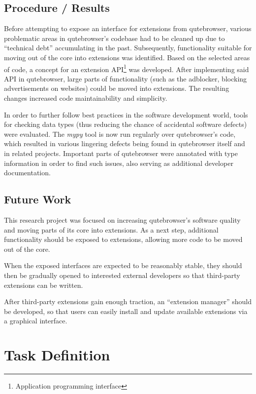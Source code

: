 \documentclass[a4paper,parskip=full,DIV=14,BCOR=15mm]{scrreprt}
\begin{document}
\section*{Procedure / Results}
Before attempting to expose an interface for extensions from qutebrowser,
various problematic areas in qutebrowser's codebase had to be cleaned up due to
``technical debt'' accumulating in the past. Subsequently, functionality
suitable for moving out of the core into extensions was identified. Based on
the selected areas of code, a concept for an extension API\footnote{Application
programming interface} was developed. After implementing said API in
qutebrowser, large parts of functionality (such as the adblocker, blocking
advertisements on websites) could be moved into extensions. The resulting
changes increased code maintainability and simplicity.

In order to further follow best practices in the software development world,
tools for checking data types (thus reducing the chance of accidental software
defects) were evaluated. The \emph{mypy} tool is now run regularly over
qutebrowser's code, which resulted in various lingering defects being found in
qutebrowser itself and in related projects. Important parts of qutebrowser were
annotated with type information in order to find such issues, also serving as
additional developer documentation.

\section*{Future Work}
This research project was focused on increasing qutebrowser's software quality
and moving parts of its core into extensions. As a next step, additional
functionality should be exposed to extensions, allowing more code to be moved
out of the core.

When the exposed interfaces are expected to be reasonably stable,
they should then be gradually opened to interested external developers so that
third-party extensions can be written.

After third-party extensions gain enough traction, an ``extension manager''
should be developed, so that users can easily install and update available
extensions via a graphical interface.

\tableofcontents

\listoffigures
{\let\clearpage\relax \listoftables}
{\let\clearpage\relax \listoflistings}


\chapter*{Task Definition}
\end{document}
